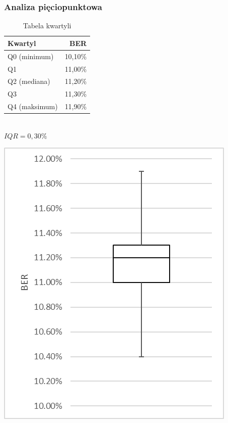 \documentclass{article}
\begin{document}
		\subsubsection{Analiza pięciopunktowa}
			\begin{table}[h]
				\begin{minipage}{0.5\linewidth}
					\caption{Tabela kwartyli}
					\label{table:student}
					\centering
					\begin{tabular}{lr}
						\toprule
						Kwartyl						& BER \\
						\midrule
						Q0 (minimum)		& 10,10\% \\
						Q1    							& 11,00\% \\
						Q2 (mediana)  		& 11,20\% \\
						Q3   							& 11,30\% \\
						Q4 (maksimum)	& 11,90\% \\
						\bottomrule
					\end{tabular}\\\vspace{5mm}
					$IQR = 0,30\%$
				\end{minipage}
				\begin{minipage}{0.45\linewidth}
					\centering
					\includegraphics[width=0.8\linewidth]{img/five_qpsk05.png}
					\label{ }
				\end{minipage}
			\end{table}
\end{document}
